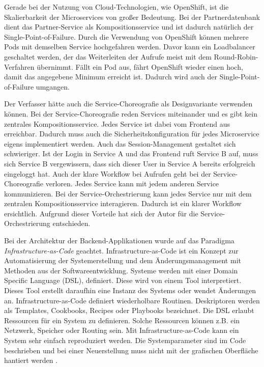 Gerade bei der Nutzung von Cloud-Technologien, wie OpenShift, ist die Skalierbarkeit der Microservices von großer Bedeutung. Bei der Partnerdatenbank dient das Partner-Service als Kompositionsservice und ist dadurch natürlich der Single-Point-of-Failure. Durch die Verwendung von OpenShift können mehrere Pods mit demselben Service hochgefahren werden. Davor kann ein Loadbalancer geschaltet werden, der das Weiterleiten der Aufrufe meist mit dem Round-Robin-Verfahren übernimmt. Fällt ein Pod aus, fährt OpenShift wieder einen hoch, damit das angegebene Minimum erreicht ist. Dadurch wird auch der Single-Point-of-Failure umgangen.

Der Verfasser hätte auch die Service-Choreografie als Designvariante verwenden können. Bei der Service-Choreografie reden Services miteinander und es gibt kein zentrales Kompositionsservice. Jedes Service ist dabei vom Frontend aus erreichbar. Dadurch muss auch die Sicherheitskonfiguration für jedes Microservice eigens implementiert werden. Auch das Session-Management gestaltet sich schwieriger. Ist der Login in Service A und das Frontend ruft Service B auf, muss sich Service B vergewissern, dass sich dieser User in Service A bereits erfolgreich eingeloggt hat. Auch der klare Workflow bei Aufrufen geht bei der Service-Choreografie verloren. Jedes Service kann mit jedem anderen Service kommunizieren. Bei der Service-Orchestrierung kann jedes Service nur mit dem zentralen Kompositionsservice interagieren. Dadurch ist ein klarer Workflow ersichtlich. Aufgrund dieser Vorteile hat sich der Autor für die Service-Orchestrierung entschieden.

Bei der Architektur der Backend-Applikationen wurde auf das Paradigma \textit{Infrastructure-as-Code} geachtet. 
Infrastructure-as-Code ist ein Konzept zur Automatisierung der Systemerstellung und dem Änderungsmanagement mit Methoden aus der Softwareentwicklung. Systeme werden mit einer Domain Specific Language (DSL), definiert. Diese wird von einem Tool interpretiert. Dieses Tool erstellt daraufhin eine Instanz des Systems oder wendet Änderungen an.
Infrastructure-as-Code definiert wiederholbare Routinen. Deskriptoren werden als Templates, Cookbooks, Recipes oder Playbooks bezeichnet. Die DSL erlaubt Ressourcen für ein System zu definieren. Solche Ressourcen können z.B. ein Netzwerk, Speicher oder Routing sein.
Mit Infrastructure-as-Code kann ein System sehr einfach reproduziert werden. Die Systemparameter sind im Code beschrieben und bei einer Neuerstellung muss nicht mit der grafischen Oberfläche hantiert werden \cite{OpenshiftDoc}.

